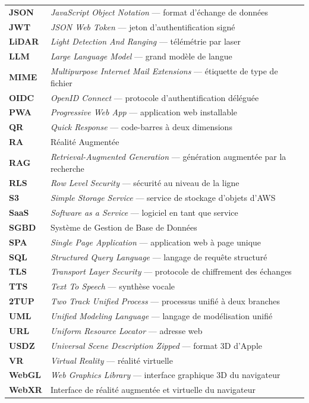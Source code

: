 \begin{longtable}{@{}L{2.6cm}@{\hspace{0.6em}}L{11.6cm}@{}}
\textbf{JSON}     & \emph{JavaScript Object Notation} — format d'échange de données \\
\textbf{JWT}      & \emph{JSON Web Token} — jeton d'authentification signé \\
\textbf{LiDAR}    & \emph{Light Detection And Ranging} — télémétrie par laser \\
\textbf{LLM}      & \emph{Large Language Model} — grand modèle de langue \\
\textbf{MIME}     & \emph{Multipurpose Internet Mail Extensions} — étiquette de type de fichier \\
\textbf{OIDC}     & \emph{OpenID Connect} — protocole d'authentification déléguée \\
\textbf{PWA}      & \emph{Progressive Web App} — application web installable \\
\textbf{QR}       & \emph{Quick Response} — code-barres à deux dimensions \\
\textbf{RA}       & Réalité Augmentée \\
\textbf{RAG}      & \emph{Retrieval-Augmented Generation} — génération augmentée par la recherche \\
\textbf{RLS}      & \emph{Row Level Security} — sécurité au niveau de la ligne \\
\textbf{S3}       & \emph{Simple Storage Service} — service de stockage d'objets d'AWS \\
\textbf{SaaS}     & \emph{Software as a Service} — logiciel en tant que service \\
\textbf{SGBD}     & Système de Gestion de Base de Données \\
\textbf{SPA}      & \emph{Single Page Application} — application web à page unique \\
\textbf{SQL}      & \emph{Structured Query Language} — langage de requête structuré \\
\textbf{TLS}      & \emph{Transport Layer Security} — protocole de chiffrement des échanges \\
\textbf{TTS}      & \emph{Text To Speech} — synthèse vocale \\
\textbf{2TUP}     & \emph{Two Track Unified Process} — processus unifié à deux branches \\
\textbf{UML}      & \emph{Unified Modeling Language} — langage de modélisation unifié \\
\textbf{URL}      & \emph{Uniform Resource Locator} — adresse web \\
\textbf{USDZ}     & \emph{Universal Scene Description Zipped} — format 3D d'Apple \\
\textbf{VR}       & \emph{Virtual Reality} — réalité virtuelle \\
\textbf{WebGL}    & \emph{Web Graphics Library} — interface graphique 3D du navigateur \\
\textbf{WebXR}    & Interface de réalité augmentée et virtuelle du navigateur \\
\end{longtable}
\endgroup

